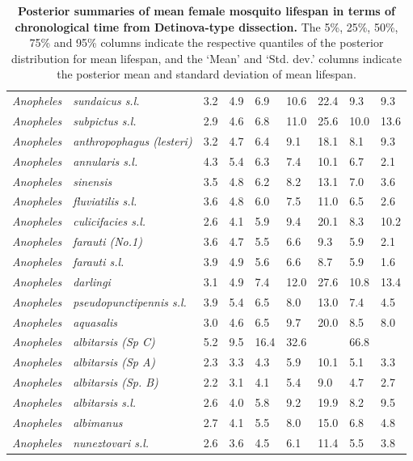 \documentclass[12pt]{article}
\begin{document}
\begin{table}[htbp!]
\begin{tabular}{l|l|l|l|l|l|l|l|l}
	\textit{Anopheles} & \textit{sundaicus s.l.} & 3.2 & 4.9 & 6.9 & 10.6 & 22.4 & 9.3 & 9.3 \\
	\textit{Anopheles} & \textit{subpictus s.l.} & 2.9 & 4.6 & 6.8 & 11.0 & 25.6 & 10.0 & 13.6
	\\
	\textit{Anopheles} & \textit{anthropophagus (lesteri)} & 3.2 & 4.7 & 6.4 & 9.1 & 18.1 & 8.1
	& 9.3 \\
	\textit{Anopheles} & \textit{annularis s.l.} & 4.3 & 5.4 & 6.3 & 7.4 & 10.1 & 6.7 & 2.1 \\
	\textit{Anopheles} & \textit{sinensis} & 3.5 & 4.8 & 6.2 & 8.2 & 13.1 & 7.0 & 3.6 \\
	\textit{Anopheles} & \textit{fluviatilis s.l.} & 3.6 & 4.8 & 6.0 & 7.5 & 11.0 & 6.5 & 2.6 \\
	\textit{Anopheles} & \textit{culicifacies s.l.} & 2.6 & 4.1 & 5.9 & 9.4 & 20.1 & 8.3 & 10.2
	\\
	\textit{Anopheles} & \textit{farauti (No.1)} & 3.6 & 4.7 & 5.5 & 6.6 & 9.3 & 5.9 &
	2.1 \\
	\textit{Anopheles} & \textit{farauti s.l.} & 3.9 & 4.9 & 5.6 & 6.6 & 8.7 & 5.9 & 1.6 \\
	\textit{Anopheles} & \textit{darlingi} & 3.1 & 4.9 & 7.4 & 12.0 & 27.6 & 10.8 & 13.4 \\
	\textit{Anopheles} & \textit{pseudopunctipennis s.l.} & 3.9 & 5.4 & 6.5 & 8.0 & 13.0 & 7.4 &
	4.5 \\
	\textit{Anopheles} & \textit{aquasalis} & 3.0 & 4.6 & 6.5 & 9.7 & 20.0 & 8.5 & 8.0 \\
	\textit{Anopheles} & \textit{albitarsis (Sp C)} & 5.2 & 9.5 & 16.4 & 32.6
	& \text{$>$100} & 66.8 & \text{$>$100} \\
	\textit{Anopheles} & \textit{albitarsis (Sp A)} & 2.3 & 3.3 & 4.3 & 5.9 & 10.1 &
	5.1 & 3.3 \\
	\textit{Anopheles} & \textit{albitarsis (Sp. B)} & 2.2 & 3.1 & 4.1 & 5.4 & 9.0 & 4.7 & 2.7
	\\
	\textit{Anopheles} & \textit{albitarsis s.l.} & 2.6 & 4.0 & 5.8 & 9.2 & 19.9 & 8.2 & 9.5 \\
	\textit{Anopheles} & \textit{albimanus} & 2.7 & 4.1 & 5.5 & 8.0 & 15.0 & 6.8 & 4.8 \\
	\textit{Anopheles} & \textit{nuneztovari s.l.} & 2.6 & 3.6 & 4.5 & 6.1 & 11.4 & 5.5 & 3.8 \\
\end{tabular}
\caption{\textbf{Posterior summaries of mean female mosquito lifespan in terms of chronological time from Detinova-type dissection.} The 5\%, 25\%, 50\%, 75\% and 95\% columns indicate the respective quantiles of the posterior distribution for mean lifespan, and the `Mean' and `Std. dev.' columns indicate the posterior mean and standard deviation of mean lifespan.}
\label{tab:detinova_lifespan_chronological}%
\end{table}
\end{document}
